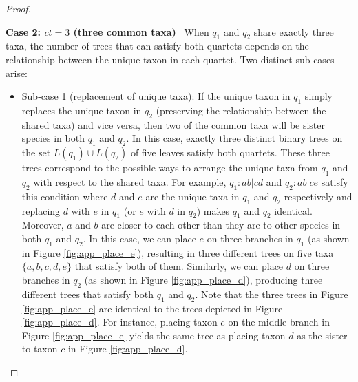 \documentclass[10pt,a4paper]{article}
\newcommand{\add}[1]{{\color{blue} #1}}
\newcommand{\addb}[1]{{\color{red} #1}}
\begin{document}
\begin{appendices}
\begin{proof}
\begin{itemize}
\begin{itemize}
\begin{itemize}
\end{itemize}
\end{itemize}




\textbf{Case 2: $ct = 3$ (three common taxa)} \ When $q_1$ and $q_2$ share exactly three taxa, the number of trees that can satisfy both quartets depends on the relationship between the unique taxon in each quartet. Two distinct sub-cases arise:

\begin{itemize} \item Sub-case 1 (replacement of unique taxa): If the unique taxon in $q_1$ simply replaces the unique taxon in $q_2$ (preserving the relationship between the shared taxa) and vice versa, then two of the common taxa will be sister species in both $q_1$ and $q_2$. In this case, exactly three distinct binary trees on the set $L(q_1)\cup L(q_2)$ of five leaves satisfy both quartets. These three trees correspond to the possible ways to arrange the unique taxa from $q_1$ and $q_2$ with respect to the shared taxa. For example, $q_1: ab|cd$ and $q_2: ab|ce$ satisfy this condition where $d$ and $e$ are the unique taxa in $q_1$ and $q_2$ respectively and replacing $d$ with $e$ in $q_1$ (or $e$ with $d$ in $q_2$) makes $q_1$ and $q_2$ identical. Moreover, $a$ and $b$ are closer to each other than they are to other species in both $q_1$ and $q_2$. In this case, we can place $e$ on three branches in $q_1$ (as shown in Figure \ref{fig:app_place_e}), resulting in three different trees on five taxa $\{a,b,c,d,e\}$ that satisfy both of them. Similarly, we can place $d$ on three branches in $q_2$ (as shown in Figure \ref{fig:app_place_d}), producing three different trees that satisfy both $q_1$ and $q_2$. Note that the three trees in Figure \ref{fig:app_place_e} are identical to the trees depicted in Figure \ref{fig:app_place_d}. For instance, placing taxon $e$ on the middle branch in Figure \ref{fig:app_place_e} yields the same tree as placing taxon $d$ as the sister to taxon $c$ in Figure \ref{fig:app_place_d}.


\end{itemize}
\end{itemize}
\end{proof}
\end{appendices}
\end{document}
